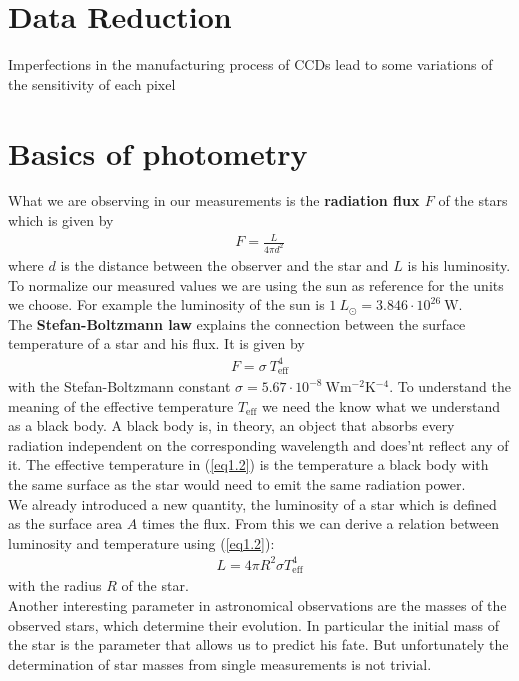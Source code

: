 \section{Data Reduction}

Imperfections in the manufacturing process of CCDs lead to some variations of the sensitivity of each pixel



\section{Basics of photometry}
What we are observing in our measurements is the \textbf{radiation flux $F$} of the stars which is given by
\begin{align}
	F = \frac{L}{4\pi d^2}\label{eq1.1}
\end{align}
where $d$ is the distance between the observer and the star and $L$ is his luminosity. \\
To normalize our measured values we are using the sun as reference for the units we choose. For example the luminosity of the sun is 
	$1 \ L_{\odot} = 3.846 \cdot 10^{26} \ \si{\watt}$. \\	
The \textbf{Stefan-Boltzmann law} explains the connection between the surface temperature of a star and his flux. It is given by
\begin{align}
	F = \sigma \ T_{\text{eff}}^4\label{eq1.2}
\end{align}
with the Stefan-Boltzmann constant $\sigma = 5.67 \cdot 10^{-8} \ \si{\watt\meter^{-2}\kelvin^{-4}}$. To understand the meaning of the effective temperature $T_{\text{eff}}$ we need the know what we understand as a black body. A black body is, in theory, an object that absorbs every radiation independent on the corresponding wavelength and does'nt reflect any of it. The effective temperature in (\ref{eq1.2}) is the temperature a black body with the same surface as the star would need to emit the same radiation power. \\
We already introduced a new quantity, the luminosity of a star which is defined as the surface area $A$ times the flux. From this we can derive a relation between luminosity and temperature using (\ref{eq1.2}):
\begin{align}
	L = 4\pi R^2\sigma T_{\text{eff}}^4
\end{align}
with the radius $R$ of the star. \\
Another interesting parameter in astronomical observations are the masses of the observed stars, which determine their  evolution. In particular the initial mass of the star is the parameter that allows us to predict his fate. But unfortunately the determination of star masses from single measurements is not trivial. \\
